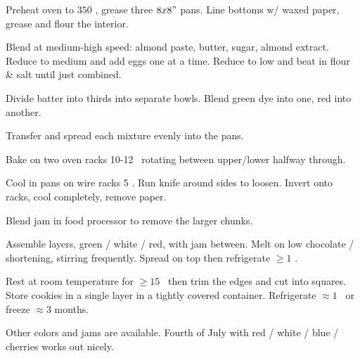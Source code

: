\begin{preparation}
\item Preheat oven to $350$ \Fahrenheit, grease three $8x8"$ pans.
Line bottoms w/ waxed paper, grease and flour the interior.

\item Blend at medium-high speed: almond paste, butter, sugar, almond extract.
Reduce to medium and add eggs one at a time.
Reduce to low and beat in flour \& salt until just combined.

\item Divide batter into thirds into separate bowls.
Blend green dye into one, red into another.

\item Transfer and spread each mixture evenly into the pans.

\item Bake on two oven racks 10-12 \minute~rotating between upper/lower halfway through.

\item Cool in pans on wire racks 5 \minute.
	Run knife around sides to loosen.
	Invert onto racks, cool completely, remove paper.

\item Blend jam in food processor to remove the larger chunks.

\item Assemble layers, green / white / red, with jam between.
	Melt on low chocolate / shortening, stirring frequently.
	Spread on top then refrigerate $\geq1$ \hour.

\item Rest at room temperature for $\geq 15$ \minute~then trim the edges and cut into squares.
	Store cookies in a single layer in a tightly covered container.
	Refrigerate $\approx 1$ \week~or freeze $\approx 3$ months.
\end{preparation}


\begin{variation}
\item Other colors and jams are available.
	Fourth of July with red / white / blue / cherries works out nicely.
\end{variation}
\recipeend
